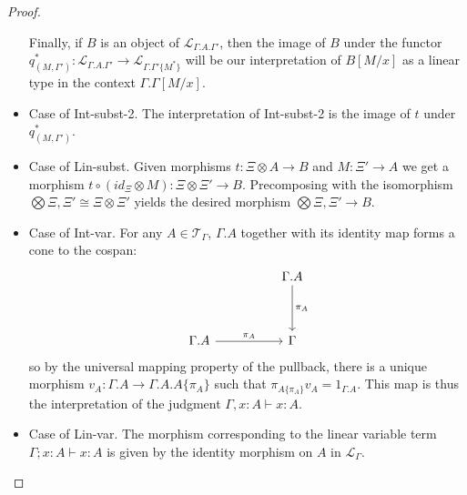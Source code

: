 \documentclass[a4paper,english]{lipics-v2018}
\begin{document}
\begin{theorem}
\begin{proof}
\begin{itemize}
Finally, if $B$ is an object of $\mathcal{L}_{\Gamma.A.\Gamma'}$, then the image of $B$ under the functor $q_{(M, \Gamma')}^* : \mathcal{L}_{\Gamma.A.\Gamma'} \to \mathcal{L}_{\Gamma.\Gamma'\{M^*\}}$ will be our interpretation of $B[M/x]$ as a linear type in the context $\Gamma.\Gamma[M/x]$.
\item Case of Int-subst-2. The interpretation of Int-subst-2 is the image of $t$ under $q_{(M, \Gamma')}^*$.
\item Case of Lin-subst. Given morphisms $t : \Xi \otimes A \to B$ and $M : \Xi' \to A$ we get a morphism $t \circ (id_\Xi \otimes M) : \Xi \otimes \Xi' \to B$. Precomposing with the isomorphism $\bigotimes \Xi, \Xi' \cong \Xi \otimes \Xi'$ yields the desired morphism $\bigotimes \Xi, \Xi' \to B$.
\item Case of Int-var. For any $A \in \mathcal{T}_\Gamma$, $\Gamma.A$ together with its identity map forms a cone to the cospan:
  \[
    \begin{tikzcd}[row sep=huge, column sep=huge]
& \Gamma.A \ar[d, "\pi_A"]\\
    \Gamma.A \ar[r, "\pi_A"] & \Gamma
    \end{tikzcd}
  \]
  so by the universal mapping property of the pullback, there is a unique morphism $v_A : \Gamma.A \to \Gamma.A.A\{\pi_A\}$ such that $\pi_{A\{\pi_A\}}v_A = 1_{\Gamma.A}$.
  This map is thus the interpretation of the judgment $\Gamma, x : A \vdash x : A$.
\item Case of Lin-var. The morphism corresponding to the linear variable term $\Gamma; x : A \vdash x : A$ is given by the identity morphism on $A$ in $\mathcal{L}_{\Gamma}$.
\end{itemize}
\end{proof}
\end{theorem}
\end{document}

